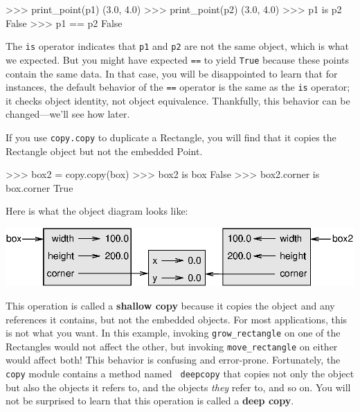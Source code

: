\beforeverb
\begin{pyinterpreter}
>>> print_point(p1)
(3.0, 4.0)
>>> print_point(p2)
(3.0, 4.0)
>>> p1 is p2
False
>>> p1 == p2
False
\end{pyinterpreter}
\afterverb
%
The {\tt is} operator indicates that {\tt p1} and {\tt p2} are not the
same object, which is what we expected.  But you might have expected
{\tt ==} to yield {\tt True} because these points contain the same
data.  In that case, you will be disappointed to learn that for
instances, the default behavior of the {\tt ==} operator is the same
as the {\tt is} operator; it checks object identity, not object
equivalence.  Thankfully, this behavior can be changed---we'll see how later.


If you use {\tt copy.copy} to duplicate a Rectangle, you will find
that it copies the Rectangle object but not the embedded Point.


\beforeverb
\begin{pyinterpreter}
>>> box2 = copy.copy(box)
>>> box2 is box
False
>>> box2.corner is box.corner
True
\end{pyinterpreter}
\afterverb
%
Here is what the object diagram looks like:


\vspace{0.1in}
\beforefig
\centerline{\includegraphics{figs/rectangle2.eps}}
\afterfig
\vspace{0.1in}

This operation is called a {\bf shallow copy} because it copies the
object and any references it contains, but not the embedded objects.
%
%
For most applications, this is not what you want.  In this example,
invoking \verb"grow_rectangle" on one of the Rectangles would not
affect the other, but invoking \verb"move_rectangle" on either would
affect both!  This behavior is confusing and error-prone.
%
%
Fortunately, the {\tt copy} module contains a method named {\tt
deepcopy} that copies not only the object but also 
the objects it refers to, and the objects {\em they} refer to,
and so on.
You will not be surprised to learn that this operation is
called a {\bf deep copy}.

